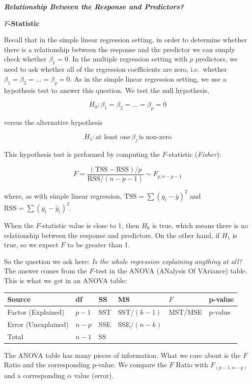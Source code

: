 \documentclass[]{book}
\begin{document}
\textbf{\emph{Relationship Between the Response and Predictors?}}

\textbf{\(F\)-Statistic}

Recall that in the simple linear regression setting, in order to
determine whether there is a relationship between the response and the
predictor we can simply check whether \(\beta_1 = 0\). In the multiple
regression setting with \(p\) predictors, we need to ask whether all of
the regression coefficients are zero, i.e.~whether
\(\beta_1 = \beta_2 = \ldots = \beta_p = 0\). As in the simple linear
regression setting, we use a hypothesis test to answer this question. We
test the null hypothesis,

\[ H_0 : \beta_1 = \beta_2 = \ldots = \beta_p = 0 \]

versus the alternative hypothesis

\[ H_1 : \text{at least one} \, \beta_j \, \text{is non-zero} \]

This hypothesis test is performed by computing the \(F\)-statistic
(\emph{Fisher}):

\[ F = \frac{ (\text{TSS} - \text{RSS})/p}{\text{RSS}/(n-p-1)} \sim F_{p,n-p-1} \]

where, as with simple linear regression,
\(\text{TSS} = \sum (y_i - \bar{y})^2\) and
\(\text{RSS} = \sum (y_i - \hat{y}_i)^2\).

When the \(F\)-statistic value is close to 1, then \(H_0\) is true,
which means there is no relationship between the response and
predictors. On the other hand, if \(H_1\) is true, so we expect \(F\) to
be greater than 1.

So the question we ask here: \emph{Is the whole regression explaining
anything at all?} The answer comes from the \(F\)-test in the ANOVA
(ANalysis Of VAriance) table. This is what we get in an ANOVA table:

\begin{longtable}[]{@{}llllll@{}}
\toprule
Source & df & SS & MS & \(F\) & p-value\tabularnewline
\midrule
\endhead
Factor (Explained) & \(p-1\) & SST & SST/\((k-1)\) & MST/MSE &
p-value\tabularnewline
Error (Unexplained) & \(n-p\) & SSE & SSE/\((n-k)\) & &\tabularnewline
Total & \(n-1\) & SS & & &\tabularnewline
\bottomrule
\end{longtable}

The ANOVA table has many pieces of information. What we care about is
the \(F\) Ratio and the corresponding p-value. We compare the \(F\)
Ratio with \(F_{(p-1,n-p)}\) and a corresponding \(\alpha\) value
(error).
\end{document}
